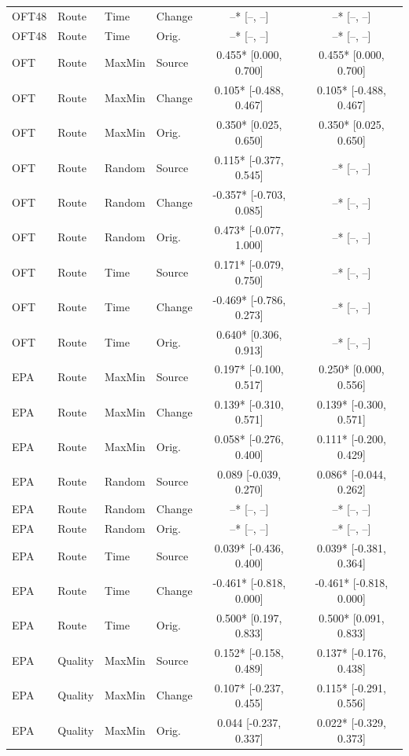 \begin{longtable}{llllcc}
OFT48 & Route & Time & Change & --* [--, --] & --* [--, --] \\
OFT48 & Route & Time & Orig. & --* [--, --] & --* [--, --] \\
OFT & Route & MaxMin & Source & 0.455* [0.000, 0.700] & 0.455* [0.000, 0.700] \\
OFT & Route & MaxMin & Change & 0.105* [-0.488, 0.467] & 0.105* [-0.488, 0.467] \\
OFT & Route & MaxMin & Orig. & 0.350* [0.025, 0.650] & 0.350* [0.025, 0.650] \\
OFT & Route & Random & Source & 0.115* [-0.377, 0.545] & --* [--, --] \\
OFT & Route & Random & Change & -0.357* [-0.703, 0.085] & --* [--, --] \\
OFT & Route & Random & Orig. & 0.473* [-0.077, 1.000] & --* [--, --] \\
OFT & Route & Time & Source & 0.171* [-0.079, 0.750] & --* [--, --] \\
OFT & Route & Time & Change & -0.469* [-0.786, 0.273] & --* [--, --] \\
OFT & Route & Time & Orig. & 0.640* [0.306, 0.913] & --* [--, --] \\
EPA & Route & MaxMin & Source & 0.197* [-0.100, 0.517] & 0.250* [0.000, 0.556] \\
EPA & Route & MaxMin & Change & 0.139* [-0.310, 0.571] & 0.139* [-0.300, 0.571] \\
EPA & Route & MaxMin & Orig. & 0.058* [-0.276, 0.400] & 0.111* [-0.200, 0.429] \\
EPA & Route & Random & Source & 0.089 [-0.039, 0.270] & 0.086* [-0.044, 0.262] \\
EPA & Route & Random & Change & --* [--, --] & --* [--, --] \\
EPA & Route & Random & Orig. & --* [--, --] & --* [--, --] \\
EPA & Route & Time & Source & 0.039* [-0.436, 0.400] & 0.039* [-0.381, 0.364] \\
EPA & Route & Time & Change & -0.461* [-0.818, 0.000] & -0.461* [-0.818, 0.000] \\
EPA & Route & Time & Orig. & 0.500* [0.197, 0.833] & 0.500* [0.091, 0.833] \\
EPA & Quality & MaxMin & Source & 0.152* [-0.158, 0.489] & 0.137* [-0.176, 0.438] \\
EPA & Quality & MaxMin & Change & 0.107* [-0.237, 0.455] & 0.115* [-0.291, 0.556] \\
EPA & Quality & MaxMin & Orig. & 0.044 [-0.237, 0.337] & 0.022* [-0.329, 0.373] \\

\end{longtable}
